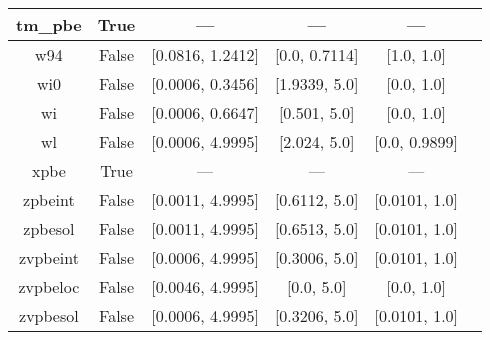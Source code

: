 \begin{tabular}{|c|c|c|c|c|l|}
       tm\_pbe &                  True &              --- &              --- &            --- &                                      \cite{Thakkar2009_134109} \\ \hline
           w94 &                 False & [0.0816, 1.2412] &    [0.0, 0.7114] &     [1.0, 1.0] &                                          \cite{Wilson1994_337} \\ \hline
           wi0 &                 False & [0.0006, 0.3456] &    [1.9339, 5.0] &     [0.0, 1.0] &                                          \cite{Wilson1998_523} \\ \hline
            wi &                 False & [0.0006, 0.6647] &     [0.501, 5.0] &     [0.0, 1.0] &                                          \cite{Wilson1998_523} \\ \hline
            wl &                 False & [0.0006, 4.9995] &     [2.024, 5.0] &  [0.0, 0.9899] &                                        \cite{Wilson1990_12930} \\ \hline
          xpbe &                  True &              --- &              --- &            --- &                                             \cite{Xu2004_4068} \\ \hline
       zpbeint &                 False & [0.0011, 4.9995] &    [0.6112, 5.0] &  [0.0101, 1.0] &                                   \cite{Constantin2011_233103} \\ \hline
       zpbesol &                 False & [0.0011, 4.9995] &    [0.6513, 5.0] &  [0.0101, 1.0] &                                   \cite{Constantin2011_233103} \\ \hline
      zvpbeint &                 False & [0.0006, 4.9995] &    [0.3006, 5.0] &  [0.0101, 1.0] &                                   \cite{Constantin2012_194105} \\ \hline
      zvpbeloc &                 False & [0.0046, 4.9995] &       [0.0, 5.0] &     [0.0, 1.0] &                                         \cite{Fabiano2015_122} \\ \hline
      zvpbesol &                 False & [0.0006, 4.9995] &    [0.3206, 5.0] &  [0.0101, 1.0] &                                   \cite{Constantin2012_194105} \\ \hline
\end{tabular}